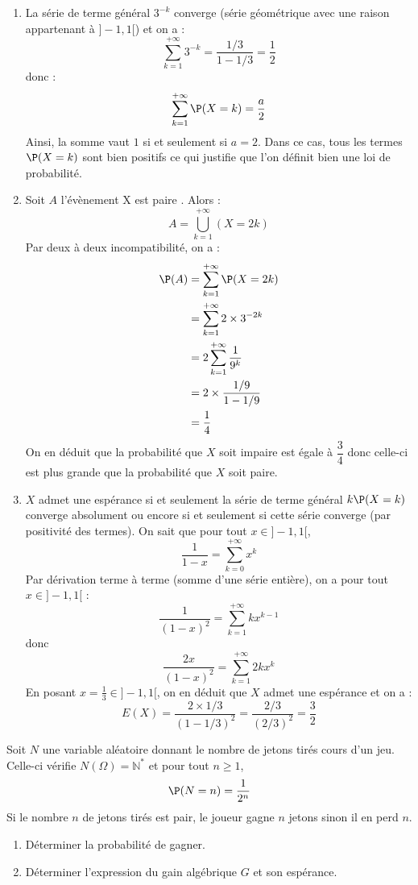 \documentclass[a4paper,10pt]{report}
\begin{document}
\corr 

\begin{enumerate}
\item La série de terme général $3^{-k}$ converge (série géométrique avec une raison appartenant à $]-1,1[$) et on a :
$$ \sum_{k=1}^{+ \infty} 3^{-k} = \dfrac{1/3}{1-1/3}= \dfrac{1}{2}$$
donc :
$$ \sum_{k=1}^{+ \infty} \P(X=k) = \dfrac{a}{2}$$
Ainsi, la somme vaut $1$ si et seulement si $a=2$. Dans ce cas, tous les termes $\P(X=k)$ sont bien positifs ce qui justifie que l'on définit bien une loi de probabilité.
\item Soit $A$ l'évènement \og X est paire \fg. Alors :
$$ A = \bigcup_{k=1}^{+ \infty} (X=2k)$$
Par deux à deux incompatibilité, on a :
\begin{align*}
 \P(A) & = \sum_{k=1}^{+ \infty} \P(X=2k) \\
 & = \sum_{k=1}^{+ \infty} 2 \times 3^{-2k} \\
 & = 2 \sum_{k=1}^{+ \infty} \dfrac{1}{9^k} \\
 & = 2 \times \dfrac{1/9}{1-1/9} \\
 & = \dfrac{1}{4} 
 \end{align*}
On en déduit que la probabilité que $X$ soit impaire est égale à $\dfrac{3}{4}$ donc celle-ci est plus grande que la probabilité que $X$ soit paire.
\item $X$ admet une espérance si et seulement la série de terme général $k\P(X=k)$ converge absolument ou encore si et seulement si cette série converge (par positivité des termes). On sait que pour tout $x \in ]-1,1[$,
$$ \dfrac{1}{1-x} = \sum_{k=0}^{+ \infty} x^k$$
Par dérivation terme à terme (somme d'une série entière), on a pour tout $x \in ]-1,1[$ :
$$ \dfrac{1}{(1-x)^2} = \sum_{k=1}^{+ \infty} k x^{k-1}$$
donc
$$ \dfrac{2x}{(1-x)^2} = \sum_{k=1}^{+ \infty} 2k x^{k}$$
En posant $x= \tfrac{1}{3} \in  ]-1,1[$, on en déduit que $X$ admet une espérance et on a :
$$ E(X) = \dfrac{2 \times 1/3}{(1-1/3)^2} = \dfrac{2/3}{(2/3)^2}= \dfrac{3}{2}$$
\end{enumerate}




\begin{Exercice}{} Soit $N$ une variable aléatoire donnant le nombre de jetons tirés cours d'un jeu. Celle-ci vérifie $N(\Omega)= \mathbb{N}^*$ et pour tout $n \geq 1$,
$$ \P(N=n) = \dfrac{1}{2^n}$$
Si le nombre $n$ de jetons tirés est pair, le joueur gagne $n$ jetons sinon il en perd $n$.
\begin{enumerate}
\item Déterminer la probabilité de gagner.
\item Déterminer l'expression du gain algébrique $G$ et son espérance.
\end{enumerate}
\end{Exercice}
\end{document}

